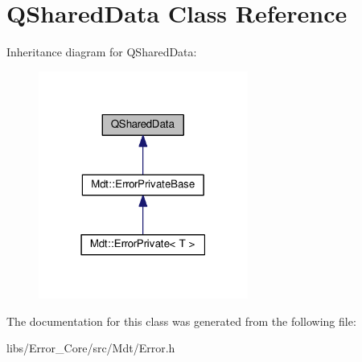 \hypertarget{class_q_shared_data}{}\section{Q\+Shared\+Data Class Reference}
\label{class_q_shared_data}


Inheritance diagram for Q\+Shared\+Data\+:
\nopagebreak
\begin{figure}[H]
\begin{center}
\leavevmode
\includegraphics[width=195pt]{class_q_shared_data__inherit__graph}
\end{center}
\end{figure}


The documentation for this class was generated from the following file\+:\begin{DoxyCompactItemize}
\item 
libs/\+Error\+\_\+\+Core/src/\+Mdt/Error.\+h\end{DoxyCompactItemize}
